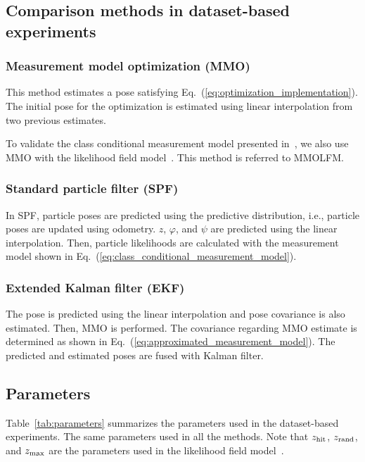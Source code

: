 \documentclass[letterpaper, 10 pt, conference]{ieeeconf}  %
\begin{document}
\subsection{Comparison methods in dataset-based experiments}

\subsubsection{Measurement model optimization (MMO)}

This method estimates a pose satisfying Eq.~(\ref{eq:optimization_implementation}).
The initial pose for the optimization is estimated using linear interpolation from two previous estimates.

To validate the class conditional measurement model presented in~\cite{AkaiIROS2018}, we also use MMO with the likelihood field model~\cite{Thrun:2005:PR:1121596}.
This method is referred to MMOLFM.

\subsubsection{Standard particle filter (SPF)}
\label{subsubsec:spf}

In SPF, particle poses are predicted using the predictive distribution, i.e., particle poses are updated using odometry.
$z$, $\varphi$, and $\psi$ are predicted using the linear interpolation.
Then, particle likelihoods are calculated with the measurement model shown in Eq.~(\ref{eq:class_conditional_measurement_model}).

\subsubsection{Extended Kalman filter (EKF)}

The pose is predicted using the linear interpolation and pose covariance is also estimated.
Then, MMO is performed.
The covariance regarding MMO estimate is determined as shown in Eq.~(\ref{eq:approximated_measurement_model}).
The predicted and estimated poses are fused with Kalman filter.



\subsection{Parameters}

Table~\ref{tab:parameters} summarizes the parameters used in the dataset-based experiments.
The same parameters used in all the methods.
Note that $z_{{\rm hit}}$, $z_{{\rm rand}}$, and $z_{{\rm max}}$ are the parameters used in the likelihood field model~\cite{Thrun:2005:PR:1121596}.
\end{document}
